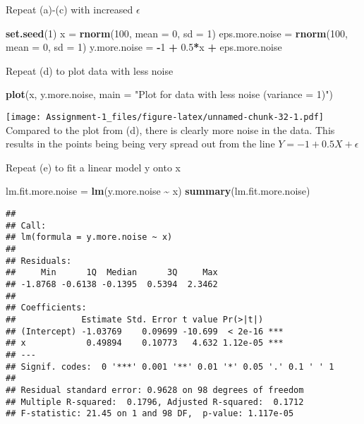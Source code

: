 \documentclass[
]{article}
\newenvironment{Shaded}{\begin{snugshade}}{\end{snugshade}}
\newcommand{\AttributeTok}[1]{\textcolor[rgb]{0.13,0.29,0.53}{#1}}
\newcommand{\DecValTok}[1]{\textcolor[rgb]{0.00,0.00,0.81}{#1}}
\newcommand{\FloatTok}[1]{\textcolor[rgb]{0.00,0.00,0.81}{#1}}
\newcommand{\FunctionTok}[1]{\textcolor[rgb]{0.13,0.29,0.53}{\textbf{#1}}}
\newcommand{\NormalTok}[1]{#1}
\newcommand{\OtherTok}[1]{\textcolor[rgb]{0.56,0.35,0.01}{#1}}
\newcommand{\SpecialCharTok}[1]{\textcolor[rgb]{0.81,0.36,0.00}{\textbf{#1}}}
\newcommand{\StringTok}[1]{\textcolor[rgb]{0.31,0.60,0.02}{#1}}
\begin{document}
Repeat (a)-(c) with increased \(\epsilon\)

\begin{Shaded}
\begin{Highlighting}[]
\FunctionTok{set.seed}\NormalTok{(}\DecValTok{1}\NormalTok{)}
\NormalTok{x }\OtherTok{=} \FunctionTok{rnorm}\NormalTok{(}\DecValTok{100}\NormalTok{, }\AttributeTok{mean =} \DecValTok{0}\NormalTok{, }\AttributeTok{sd =} \DecValTok{1}\NormalTok{)}
\NormalTok{eps.more.noise }\OtherTok{=} \FunctionTok{rnorm}\NormalTok{(}\DecValTok{100}\NormalTok{, }\AttributeTok{mean =} \DecValTok{0}\NormalTok{, }\AttributeTok{sd =} \DecValTok{1}\NormalTok{)}
\NormalTok{y.more.noise }\OtherTok{=} \SpecialCharTok{{-}}\DecValTok{1} \SpecialCharTok{+} \FloatTok{0.5}\SpecialCharTok{*}\NormalTok{x }\SpecialCharTok{+}\NormalTok{ eps.more.noise}
\end{Highlighting}
\end{Shaded}

Repeat (d) to plot data with less noise

\begin{Shaded}
\begin{Highlighting}[]
\FunctionTok{plot}\NormalTok{(x, y.more.noise, }\AttributeTok{main =} \StringTok{"Plot for data with less noise (variance = 1)"}\NormalTok{)}
\end{Highlighting}
\end{Shaded}

\texttt{[image: Assignment-1\_files/figure-latex/unnamed-chunk-32-1.pdf]}
Compared to the plot from (d), there is clearly more noise in the data.
This results in the points being being very spread out from the line
\(Y=-1+0.5 X+\epsilon\)

Repeat (e) to fit a linear model y onto x

\begin{Shaded}
\begin{Highlighting}[]
\NormalTok{lm.fit.more.noise }\OtherTok{=} \FunctionTok{lm}\NormalTok{(y.more.noise }\SpecialCharTok{\textasciitilde{}}\NormalTok{ x)}
\FunctionTok{summary}\NormalTok{(lm.fit.more.noise)}
\end{Highlighting}
\end{Shaded}

\begin{verbatim}
## 
## Call:
## lm(formula = y.more.noise ~ x)
## 
## Residuals:
##     Min      1Q  Median      3Q     Max 
## -1.8768 -0.6138 -0.1395  0.5394  2.3462 
## 
## Coefficients:
##             Estimate Std. Error t value Pr(>|t|)    
## (Intercept) -1.03769    0.09699 -10.699  < 2e-16 ***
## x            0.49894    0.10773   4.632 1.12e-05 ***
## ---
## Signif. codes:  0 '***' 0.001 '**' 0.01 '*' 0.05 '.' 0.1 ' ' 1
## 
## Residual standard error: 0.9628 on 98 degrees of freedom
## Multiple R-squared:  0.1796, Adjusted R-squared:  0.1712 
## F-statistic: 21.45 on 1 and 98 DF,  p-value: 1.117e-05
\end{verbatim}
\end{document}
